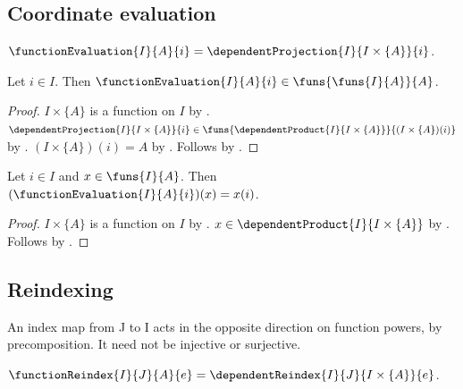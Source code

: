 \subsection{Coordinate evaluation}

\begin{definition}\label{function_evaluation}
    $\functionEvaluation{I}{A}{i}=\dependentProjection{I}{I\times\{A\}}{i}$.
\end{definition}

\begin{proposition}\label{function_evaluation_type}
    Let $i\in I$.
    Then $\functionEvaluation{I}{A}{i}\in\funs{\funs{I}{A}}{A}$.
\end{proposition}
\begin{proof}
    $I\times\{A\}$ is a function on $I$ by
        .
    $\dependentProjection{I}{I\times\{A\}}{i}\in
        \funs{\dependentProduct{I}{I\times\{A\}}}{(I\times\{A\})(i)}$ by
        .
    $(I\times\{A\})(i)=A$ by .
    Follows by .
\end{proof}

\begin{proposition}\label{function_evaluation_apply}
    Let $i\in I$ and $x\in\funs{I}{A}$.
    Then $(\functionEvaluation{I}{A}{i})(x)=x(i)$.
\end{proposition}
\begin{proof}
    $I\times\{A\}$ is a function on $I$ by
        .
    $x\in\dependentProduct{I}{I\times\{A\}}$ by
        .
    Follows by .
\end{proof}

\subsection{Reindexing}

An index map from J to I acts in the opposite direction on function powers,
by precomposition. It need not be injective or surjective.

\begin{definition}\label{function_reindex}
    $\functionReindex{I}{J}{A}{e}=\dependentReindex{I}{J}{I\times\{A\}}{e}$.
\end{definition}

